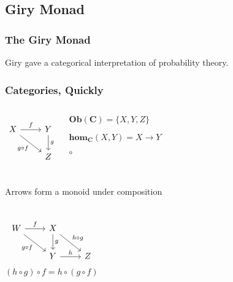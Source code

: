\documentclass[usenames,dvipsnames]{beamer}
\begin{document}
\subsection{Giry Monad}
\begin{frame}
  \frametitle{The Giry Monad}
  Giry gave a categorical interpretation of
  probability theory.
\end{frame}
\begin{frame}[fragile]
  \frametitle{Categories, Quickly}
  \pause
  \begin{columns}
    \begin{equation*}
      \begin{tikzcd}
        X \arrow[r, "f"] \arrow[rd, "g \circ f"'] & Y \arrow[d, "g"] \\
                                                  & Z
      \end{tikzcd}
    \end{equation*}
    \begin{description}
      \pause
      \item[Objects] $\mathbf{Ob}(\mathbf{C}) = \{X, Y, Z\}$
      \pause
      \item[Arrows] $\mathbf{hom}_{\mathbf{C}}(X, Y) = X \rightarrow Y$
      \pause
      \item[Composition] $\circ$
    \end{description}
  \end{columns}
  \pause
  \begin{block}{Arrows form a monoid under composition}
    \begin{columns}
      \begin{equation*}
        \begin{tikzcd}
          W \ar[r, "f"] \ar[rd, "g \circ f"'] & X \ar[d, "g"]  \ar[rd, "h \circ g"] & \\
                                              & Y \ar[r, "h"] & Z
        \end{tikzcd}
      \end{equation*}
        \begin{equation}
          (h \circ g) \circ f = h \circ (g \circ f)
        \end{equation}
    \end{columns}
    \begin{columns}
      \begin{equation*}

\end{equation*}
\end{columns}
\end{block}
\end{frame}
\end{document}
